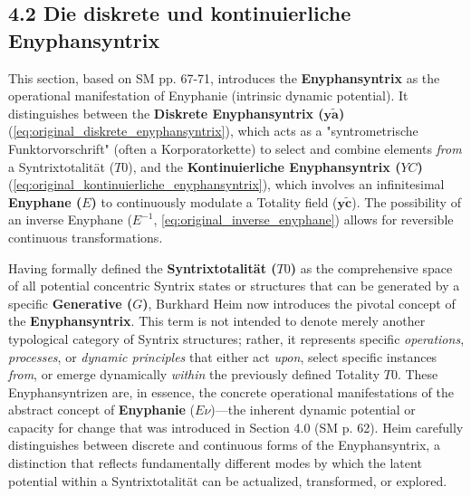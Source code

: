 \documentclass[12pt]{article}
\newcommand{\syntrixtotalitaet}{T0}
\newcommand{\generative}{G}
\newcommand{\diskreteEnyphansyntrix}{\bm{y\widetilde{a}}}
\newcommand{\kontinuierlicheEnyphansyntrix}{YC}
\newcommand{\enyphane}{E}
\begin{document}
\subsection{4.2 Die diskrete und kontinuierliche Enyphansyntrix}
\label{sec:enyphansyntrix_types}

This section, based on SM pp. 67-71, introduces the \textbf{Enyphansyntrix} as the operational manifestation of Enyphanie (intrinsic dynamic potential). It distinguishes between the \textbf{Diskrete Enyphansyntrix (\(\diskreteEnyphansyntrix\))} (\eqref{eq:original_diskrete_enyphansyntrix}), which acts as a "syntrometrische Funktorvorschrift" (often a Korporatorkette) to select and combine elements \textit{from} a Syntrixtotalität (\(\syntrixtotalitaet\)), and the \textbf{Kontinuierliche Enyphansyntrix (\(\kontinuierlicheEnyphansyntrix\))} (\eqref{eq:original_kontinuierliche_enyphansyntrix}), which involves an infinitesimal \textbf{Enyphane (\(\enyphane\))} to continuously modulate a Totality field (\(\mathbf{y\widetilde{c}}\)). The possibility of an inverse Enyphane (\(\enyphane^{-1}\), \eqref{eq:original_inverse_enyphane}) allows for reversible continuous transformations.

Having formally defined the \textbf{Syntrixtotalität (\( \syntrixtotalitaet \))} as the comprehensive space of all potential concentric Syntrix states or structures that can be generated by a specific \textbf{Generative (\( \generative \))}, Burkhard Heim now introduces the pivotal concept of the \textbf{Enyphansyntrix}. This term is not intended to denote merely another typological category of Syntrix structures; rather, it represents specific \textit{operations}, \textit{processes}, or \textit{dynamic principles} that either act \textit{upon}, select specific instances \textit{from}, or emerge dynamically \textit{within} the previously defined Totality \( \syntrixtotalitaet \). These Enyphansyntrizen are, in essence, the concrete operational manifestations of the abstract concept of \textbf{Enyphanie} (\(E\nu\))—the inherent dynamic potential or capacity for change that was introduced in Section 4.0 (SM p. 62). Heim carefully distinguishes between discrete and continuous forms of the Enyphansyntrix, a distinction that reflects fundamentally different modes by which the latent potential within a Syntrixtotalität can be actualized, transformed, or explored.
\end{document}
